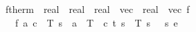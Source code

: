 \documentclass[envcountsame,envcountsect]{llncs}
\newcommand{\IF}[3]{\mathbf{if}\ #1\ \mathbf{then}\ #2\ \mathbf{else}\ #3}
\begin{document}
\begin{example}
\begin{isabellebody}
\isanewline
{}\isamarkupfalse%
\ ftherm\ {\isacharcolon}{\isacharcolon}\ {\isachardoublequoteopen}real\ {\isasymRightarrow}\ real\ {\isasymRightarrow}\ {\isacharparenleft}real{\isacharcomma}\ {}{\isacharparenright}\ vec\ {\isasymRightarrow}\ {\isacharparenleft}real{\isacharcomma}\ {}{\isacharparenright}\ vec{\isachardoublequoteclose}\ {\isacharparenleft}{\isachardoublequoteopen}f{\isachardoublequoteclose}{\isacharparenright}\isanewline
\ \ \ {\isachardoublequoteopen}f\ a\ c\ {\isasymequiv}\ {\isasymlbrakk}{\isacharbrackleft}T\ {\isasymmapsto}\isactrlsub s\ {\isacharminus}\ a\ {\isacharasterisk}\ {\isacharparenleft}T\ {\isacharminus}\ c{\isacharparenright}{\isacharcomma}\ t\ {\isasymmapsto}\isactrlsub s\ {}{\isacharcomma}\ T\ {\isasymmapsto}\isactrlsub s\ {}{\isacharcomma}\ {\isasymtheta}\ {\isasymmapsto}\isactrlsub s\ {}{\isacharbrackright}{\isasymrbrakk}\isactrlsub e{\isachardoublequoteclose}\isanewline
\end{isabellebody}

\end{example}
\end{document}
